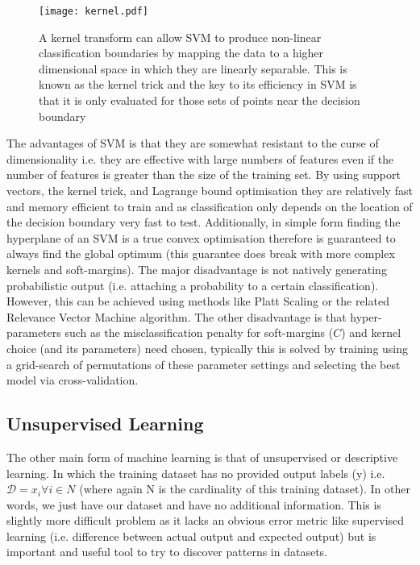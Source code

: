 \begin{figure}[h]
    \texttt{[image: kernel.pdf]}
    \caption[Kernel trick]{A kernel transform can allow SVM to produce non-linear classification boundaries by mapping
        the data to a higher dimensional space in which they are linearly separable. This is known as the kernel
        trick and the key to its efficiency in SVM is that it is only evaluated for those sets of points near the 
    decision boundary}
    \label{fig:kernel}
\end{figure}



The advantages of SVM is that they are somewhat resistant to the curse of dimensionality i.e. they are effective with large numbers of features
even if the number of features is greater than the size of the training set.  By using support vectors, the kernel trick, and Lagrange bound optimisation 
they are relatively fast and memory efficient to train and as classification only depends on the location of the decision boundary very fast to test.
Additionally, in simple form finding the hyperplane of an SVM is a true convex optimisation therefore is guaranteed to always find the global optimum (this
guarantee does break with more complex kernels and soft-margins).  
The major disadvantage is not natively generating probabilistic output (i.e. attaching a probability to a certain classification).  However, this can be achieved
using methods like Platt Scaling or the related Relevance Vector Machine algorithm.   The other disadvantage is that hyper-parameters such as the misclassification
penalty for soft-margins (\(C\)) and kernel choice (and its parameters) need chosen, typically this is solved by training using a grid-search of permutations
of these parameter settings and selecting the best model via cross-validation.


\subsection{Unsupervised Learning}

The other main form of machine learning is that of unsupervised or descriptive learning.
In which the training dataset has no provided output labels (y) i.e. 
\(\mathcal{D} = {x_{i} \forall i \in N}\) (where again N is the cardinality of 
this training dataset). In other words, we just have our dataset and have no additional information.
This is slightly more difficult problem as it lacks an obvious error metric like supervised learning 
(i.e. difference between actual output and expected output) but is important and useful tool to
try to discover patterns in datasets.

